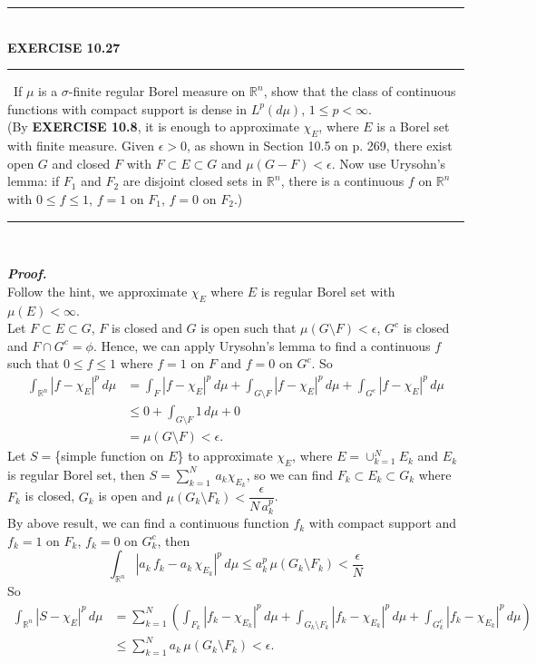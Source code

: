 \documentclass[a4paper,11pt]{article}
\begin{document}
	\begin{flushleft}
		\rule[-0.5ex]{17cm}{2pt}\\
			\textbf{EXERCISE 10.27}\\
		\rule[1.5ex]{17cm}{0.5pt}\
			If $\mu$ is a $\sigma$-finite regular Borel measure on $\mathbb{R}^n$, show that the class of continuous functions with compact support is dense in $L^p(d\mu)$, $1 \leq p < \infty$.\\
			(By \textbf{EXERCISE 10.8}, it is enough to approximate $\chi_E$, where $E$ is a Borel set with finite measure. Given $\epsilon > 0$, as shown in Section 10.5 on p. 269, there exist open $G$ and closed $F$ with $F \subset E \subset G$ and $\mu(G-F) < \epsilon$. Now use Urysohn's lemma: if $F_1$ and $F_2$ are disjoint closed sets in $\mathbb{R}^n$, there is a continuous $f$ on $\mathbb{R}^n$ with $0 \leq f \leq 1$, $f = 1$ on $F_1$, $f = 0$ on $F_2$.)
		\rule[1.0ex]{17cm}{0.5pt}\
	\end{flushleft}
	\textit{\textbf {Proof.}}\\
		Follow the hint, we approximate $\chi_E$ where $E$ is regular Borel set with $\mu(E) < \infty$.\\
		Let $F \subset E \subset G$, $F$ is closed and $G$ is open such that $\mu(G \setminus F) < \epsilon$, $G^c$ is closed and $F \cap G^c = \phi$. Hence, we can apply Urysohn's lemma to find a continuous $f$ such that $0 \leq f \leq 1$ where $f = 1$ on $F$ and $f = 0$ on $G^c$. So
			$$\begin{aligned}
			\int_{\mathbb{R}^n} \left| f - \chi_E \right|^p \,d\mu
			&= \int_F \left| f - \chi_E \right|^p \,d\mu
			+ \int_{G \setminus F} \left| f - \chi_E \right|^p \,d\mu
			+ \int_{G^c} \left| f - \chi_E \right|^p \,d\mu\\
			&\leq 0 + \int_{G \setminus F} 1 \,d\mu + 0\\
			&= \mu(G \setminus F) < \epsilon.
			\end{aligned}$$
		Let $S=$\{simple function on $E$\} to approximate $\chi_E$, where $E = \cup_{k = 1}^N E_k$ and $E_k$ is regular Borel set, then $S = \sum_{k=1}^N \,a_k\chi_{E_k}$, so we can find $F_k \subset E_k \subset G_k$ where $F_k$ is closed, $G_k$ is open and $\mu(G_k \setminus F_k) < \dfrac{\epsilon}{N\,a_k^p}$.\\
		By above result, we can find a continuous function $f_k$ with compact support and $f_k = 1$ on $F_k$, $f_k = 0$ on $G_k^c$, then
			$$\int_{\mathbb{R}^n} \left|a_k\,f_k - a_k\,\chi_{E_k}\right|^p\,d\mu
			\leq a_k^p\,\mu(G_k \setminus F_k)
			< \frac{\epsilon}{N}$$
		So
			$$\begin{aligned}
			\int_{\mathbb{R}^n} \left|S - \chi_E\right|^p\,d\mu
			&= \sum_{k=1}^N \left(
			\int_{F_k} \left| f_k - \chi_{E_k} \right|^p \,d\mu
			+ \int_{G_k \setminus F_k} \left| f_k - \chi_{E_k} \right|^p \,d\mu
			+ \int_{G_k^c} \left| f_k - \chi_{E_k} \right|^p \,d\mu
			\right)\\
			&\leq \sum_{k=1}^N a_k\,\mu(G_k \setminus F_k)
			< \epsilon.
			\end{aligned}$$
\end{document}
